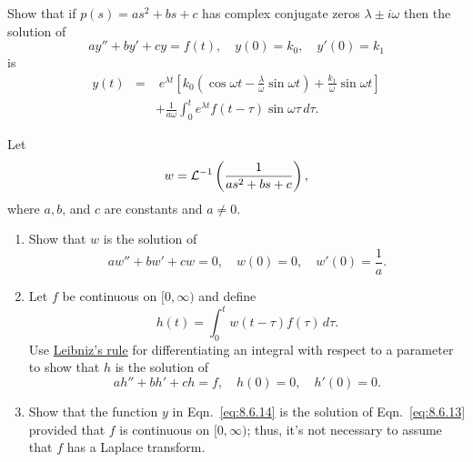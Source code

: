 \documentclass{ximera}
\begin{document}
\begin{problem}\label{exer:8.6.10}
 Show that if $p(s)=as^2+bs+c$ has
 complex conjugate zeros $\lambda\pm i\omega$
then the solution of
$$
ay''+by'+cy=f(t),\quad y(0)=k_0,\quad y'(0)=k_1
$$
is
\begin{eqnarray*}
y(t)&=&\;  e^{\lambda t}\left[k_0(\cos\omega t-\frac{\lambda}{\omega}\sin\omega
t)+\frac{k_1}{\omega}\sin\omega t\right]
\\
&&+\frac{1}{a\omega}\int_0^te^{\lambda t}f(t-\tau)\sin\omega\tau\,
d\tau.
\end{eqnarray*}
\end{problem}

\begin{problem}\label{exer:8.6.11}
Let
$$
w={\cal L}^{-1}\left(\frac{1}{as^2+bs+c}\right),
$$
where $a,b$, and $c$ are constants and $a\ne0$.
\begin{enumerate}
\item %
Show that $w$ is the solution of
$$
aw''+bw'+cw=0,\quad w(0)=0,\quad w'(0)=\frac{1}{a}.
$$
\item %
Let $f$ be continuous on $[0,\infty)$  and define
$$
h(t)=\int_0^t w(t-\tau)f(\tau)\,d\tau.
$$
Use
\href{http://www-history.mcs.st-and.ac.uk/Mathematicians/Leibniz.html}{Leibniz's rule} for differentiating an integral with
respect to a parameter to show  that $h$ is the solution of
$$
ah''+bh'+ch=f,\quad h(0)=0,\quad h'(0)=0.
$$
\item %
 Show that the function $y$ in  Eqn.~\eqref{eq:8.6.14} is the solution of
Eqn.~\eqref{eq:8.6.13} provided that $f$ is continuous on $[0,\infty)$;
thus, it's not necessary to assume that $f$ has a Laplace transform.
\end{enumerate}
\end{problem}
\end{document}
